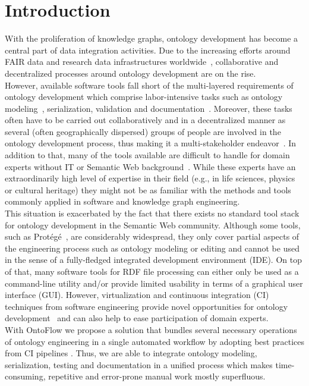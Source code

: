 \documentclass[runningheads]{llncs}
\begin{document}
\section{Introduction}
With the proliferation of knowledge graphs, ontology development has become a central part of data integration activities. Due to the increasing efforts around FAIR data and research data infrastructures worldwide~\cite{fair}, collaborative and decentralized processes around ontology development are on the rise.\\ However, available software tools fall short of the multi-layered requirements of ontology development which comprise labor-intensive tasks such as ontology modeling~\cite{noy}, serialization, validation and documentation~\cite{survey}. Moreover, these tasks often have to be carried out collaboratively and in a decentralized manner as several (often geographically dispersed) groups of people are involved in the ontology development process, thus making it a multi-stakeholder endeavor~\cite{sure}. In addition to that, many of the tools available are difficult to handle for domain experts without IT or Semantic Web background~\cite{tudorache}. While these experts have an extraordinarily high level of expertise in their field (e.g., in life sciences, physics or cultural heritage) they might not be as familiar with the methods and tools commonly applied in software and knowledge graph engineering.\\ This situation is exacerbated by the fact that there exists no standard tool stack for ontology development in the Semantic Web community. Although some tools, such as Protégé~\cite{protege}, are considerably widespread, they only cover partial aspects of the engineering process such as ontology modeling or editing and cannot be used in the sense of a fully-fledged integrated development environment (IDE). On top of that, many software tools for RDF file processing can either only be used as a command-line utility and/or provide limited usability in terms of a graphical user interface (GUI). However, virtualization and continuous integration (CI) techniques from software engineering provide novel opportunities for ontology development~\cite{fowler} and can also help to ease participation of domain experts.\\
With OntoFlow we propose a solution that bundles several necessary operations of ontology engineering in a single automated workflow by adopting best practices from CI pipelines \cite{humble}. Thus, we are able to integrate ontology modeling, serialization, testing and documentation in a unified process which makes time-consuming, repetitive and error-prone manual work mostly superfluous.\\
\end{document}
